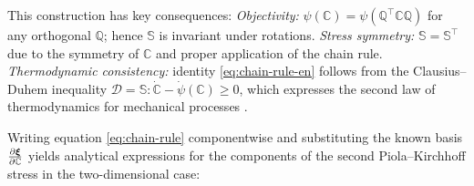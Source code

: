 This construction has key consequences:
\newline
\textit{Objectivity:} $\psi(\mathbb{C})=\psi(\mathbb{Q}^\top\mathbb{C}\mathbb{Q})$ for any orthogonal $\mathbb{Q}$; hence $\mathbb{S}$ is invariant under rotations.
\newline
\textit{Stress symmetry:} $\mathbb{S}=\mathbb{S}^\top$ due to the symmetry of $\mathbb{C}$ and proper application of the chain rule.
\newline
\textit{Thermodynamic consistency:} identity \eqref{eq:chain-rule-en} follows from the Clausius--Duhem inequality
$\mathcal{D} = \mathbb{S} : \dot{\mathbb{C}} - \dot{\psi}(\mathbb{C}) \geq 0$,
which expresses the second law of thermodynamics for mechanical processes \cite{truesdell1984historical,truesdell2004nonlinear}.




Writing equation \eqref{eq:chain-rule} componentwise and substituting the known basis $\frac{\partial \boldsymbol{\xi}}{\partial \mathbb{C}}$ yields analytical expressions for the components of the second Piola--Kirchhoff stress in the two-dimensional case:

